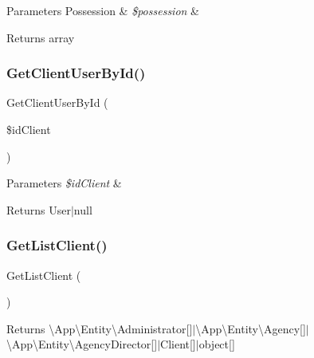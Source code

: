 \begin{DoxyParams}[1]{Parameters}
Possession & {\em \$possession} & \\
\hline
\end{DoxyParams}
\begin{DoxyReturn}{Returns}
array 
\end{DoxyReturn}
\mbox{\label{class_app_1_1_b_l_1_1_client_manager_a7ae8d607f90b2993e3c58abe41af7b7d}} 
\subsubsection{\texorpdfstring{GetClientUserById()}{GetClientUserById()}}
{\footnotesize\ttfamily Get\+Client\+User\+By\+Id (\begin{DoxyParamCaption}\item[{}]{\$id\+Client }\end{DoxyParamCaption})}


\begin{DoxyParams}{Parameters}
{\em \$id\+Client} & \\
\hline
\end{DoxyParams}
\begin{DoxyReturn}{Returns}
User$\vert$null 
\end{DoxyReturn}
\mbox{\label{class_app_1_1_b_l_1_1_client_manager_a388df05d7f84ce50d3ab96a175d2a98e}} 
\subsubsection{\texorpdfstring{GetListClient()}{GetListClient()}}
{\footnotesize\ttfamily Get\+List\+Client (\begin{DoxyParamCaption}{ }\end{DoxyParamCaption})}

\begin{DoxyReturn}{Returns}
\textbackslash{}\+App\textbackslash{}\+Entity\textbackslash{}\+Administrator\mbox{[}\mbox{]}$\vert$\textbackslash{}\+App\textbackslash{}\+Entity\textbackslash{}\+Agency\mbox{[}\mbox{]}$\vert$\textbackslash{}\+App\textbackslash{}\+Entity\textbackslash{}\+Agency\+Director\mbox{[}\mbox{]}$\vert$\+Client\mbox{[}\mbox{]}$\vert$object\mbox{[}\mbox{]} 
\end{DoxyReturn}
\mbox{\label{class_app_1_1_b_l_1_1_client_manager_a2d22ea4606c81445dcbe1cc64fa7b6f9}} 
